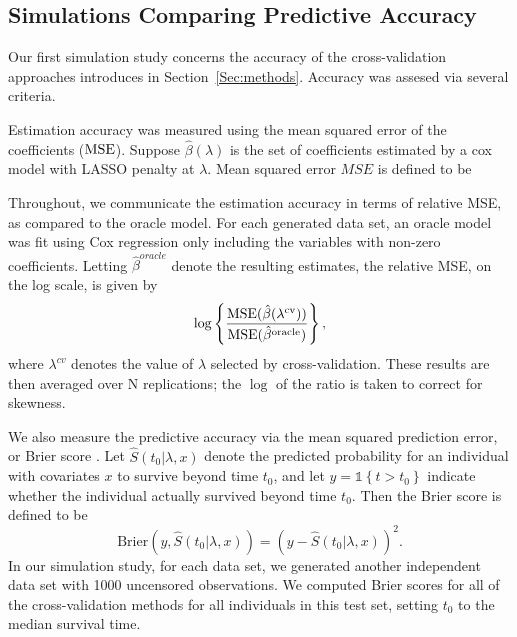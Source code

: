 \subsection {Simulations Comparing Predictive Accuracy}
\label{Sec:accuracy}

Our first simulation study concerns the accuracy of the cross-validation approaches introduces in Section~\ref{Sec:methods}.  Accuracy was assesed via several criteria.

Estimation accuracy was measured using the mean squared error of the coefficients ($\textrm{MSE}$). Suppose $\hat{\beta}(\lambda)$ is the set of coefficients estimated by a cox model with LASSO penalty at $\lambda$. Mean squared error $MSE$ is defined to be 

Throughout, we communicate the estimation accuracy in terms of relative MSE, as compared to the oracle model.  For each generated data set, an oracle model was fit using Cox regression only including the variables with non-zero coefficients. Letting $\hat{\beta}^{oracle}$ denote the resulting estimates, the relative MSE, on the log scale, is given by
\begin{equation}
\log\left\{ \frac{\textrm{MSE}(\hat{\beta}(\lambda^{\text{cv}}))}{\textrm{MSE}(\hat{\beta}^{\text{oracle}})} \right\},
\end{equation}
where $\lambda^{cv}$ denotes the value of $\lambda$ selected by cross-validation.   These results are then averaged over N replications; the $\log$ of the ratio is taken to correct for skewness.


\par We also measure the predictive accuracy via the mean squared prediction error, or Brier score \citep{VanHouwelingen2011}. Let $\hat{S}(t_0|\lambda,x)$ denote the predicted probability for an individual with covariates $x$ to survive beyond time $t_0$, and let $y = \mathbb{1}\left\{ t > t_{0}\right\}$ indicate whether the individual actually survived beyond time $t_0$. Then the Brier score is defined to be
\begin{equation}
\text{Brier}(y, \hat{S}(t_0|\lambda,x)) = (y - \hat{S}(t_0|\lambda,x))^2.
\end{equation}
In our simulation study, for each data set, we generated another independent data set with 1000 uncensored observations. We computed Brier scores for all of the cross-validation methods for all individuals in this test set, setting $t_0$ to the median survival time.

